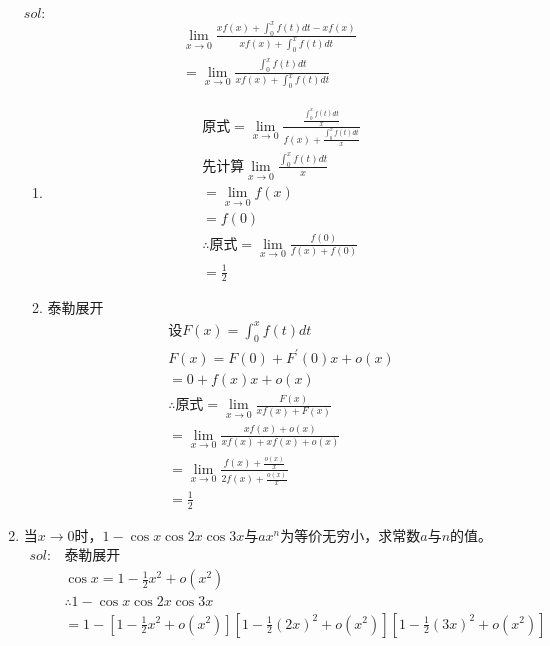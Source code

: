 \begin{enumerate}[{例}1.]
        $sol:$
        \begin{align*}
            &\lim_{x \to 0}\frac{xf(x)+\int_0^x f(t)dt-xf(x)}{xf(x)+\int_0^x f(t)dt}\\
            &=\lim_{x \to 0}\frac{\int_0^x f(t)dt}{xf(x)+\int_0^x f(t)dt}
        \end{align*}
        \begin{enumerate}[$1^\circ$]
            \item 
                \begin{align*}
                    &\mbox{原式}=\lim_{x \to 0}\frac{\frac{\int_0^x f(t)dt}{x}}{f(x)+\frac{\int_0^x f(t) dt}{x}}\\
                    &\mbox{先计算}\lim_{x \to 0}\frac{\int_0^x f(t) dt}{x}\\
                    &=\lim_{x \to 0}f(x)\\
                    &=f(0)\\
                    &\therefore\mbox{原式}=\lim_{x \to 0}\frac{f(0)}{f(x)+f(0)}\\
                    &=\frac{1}{2}
                \end{align*}
            \item 泰勒展开
                \begin{align*}
                    &\mbox{设}F(x)=\int_0^x f(t)dt\\
                    &F(x)=F(0)+F^{\prime}(0)x+o(x)\\
                    &=0+f(x)x+o(x)\\
                    &\therefore\mbox{原式}=\lim_{x \to 0}\frac{F(x)}{xf(x)+F(x)}\\
                    &=\lim_{x \to 0}\frac{xf(x)+o(x)}{xf(x)+xf(x)+o(x)}\\
                    &=\lim_{x \to 0}\frac{f(x)+\frac{o(x)}{x}}{2f(x)+\frac{o(x)}{x}}\\
                    &=\frac{1}{2}
                \end{align*}
        \end{enumerate}
    \item 当$x\to0$时，$1-\cos x\cos 2x\cos 3x$与$ax^n$为等价无穷小，求常数$a$与$n$的值。
        \begin{align*}
            sol:&\mbox{泰勒展开}\\
                &\cos x=1-\frac{1}{2}x^2+o(x^2)\\
                &\therefore 1-\cos x \cos 2x \cos 3x\\
                &=1-[1-\frac{1}{2}x^2+o(x^2)][1-\frac{1}{2}(2x)^2+o(x^2)][1-\frac{1}{2}(3x)^2+o(x^2)]\\

\end{align*}
\end{enumerate}
